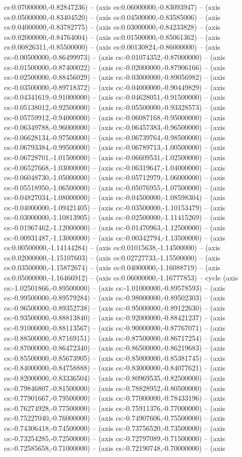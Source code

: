 cs:0.07000000,-0.82847236) -- (axis cs:0.06000000,-0.83093947) -- (axis cs:0.05000000,-0.83404520) -- (axis cs:0.04500000,-0.83585006) -- (axis cs:0.04000000,-0.83782775) -- (axis cs:0.03000000,-0.84233828) -- (axis cs:0.02000000,-0.84764004) -- (axis cs:0.01500000,-0.85061362) -- (axis cs:0.00826311,-0.85500000) -- (axis cs:0.00130824,-0.86000000) -- (axis cs:-0.00500000,-0.86499973) -- (axis cs:-0.01074352,-0.87000000) -- (axis cs:-0.01500000,-0.87400022) -- (axis cs:-0.02000000,-0.87906166) -- (axis cs:-0.02500000,-0.88456029) -- (axis cs:-0.03000000,-0.89056982) -- (axis cs:-0.03500000,-0.89718372) -- (axis cs:-0.04000000,-0.90449829) -- (axis cs:-0.04341619,-0.91000000) -- (axis cs:-0.04628051,-0.91500000) -- (axis cs:-0.05138012,-0.92500000) -- (axis cs:-0.05500000,-0.93328573) -- (axis cs:-0.05759912,-0.94000000) -- (axis cs:-0.06087168,-0.95000000) -- (axis cs:-0.06349788,-0.96000000) -- (axis cs:-0.06457383,-0.96500000) -- (axis cs:-0.06628134,-0.97500000) -- (axis cs:-0.06739764,-0.98500000) -- (axis cs:-0.06793384,-0.99500000) -- (axis cs:-0.06789713,-1.00500000) -- (axis cs:-0.06728701,-1.01500000) -- (axis cs:-0.06609531,-1.02500000) -- (axis cs:-0.06527668,-1.03000000) -- (axis cs:-0.06319647,-1.04000000) -- (axis cs:-0.06048730,-1.05000000) -- (axis cs:-0.05712979,-1.06000000) -- (axis cs:-0.05518950,-1.06500000) -- (axis cs:-0.05076955,-1.07500000) -- (axis cs:-0.04827034,-1.08000000) -- (axis cs:-0.04500000,-1.08598304) -- (axis cs:-0.04000000,-1.09421405) -- (axis cs:-0.03500000,-1.10153479) -- (axis cs:-0.03000000,-1.10813905) -- (axis cs:-0.02500000,-1.11415269) -- (axis cs:-0.01967462,-1.12000000) -- (axis cs:-0.01470963,-1.12500000) -- (axis cs:-0.00931487,-1.13000000) -- (axis cs:-0.00342794,-1.13500000) -- (axis cs:0.00500000,-1.14144284) -- (axis cs:0.01015638,-1.14500000) -- (axis cs:0.02000000,-1.15107603) -- (axis cs:0.02727733,-1.15500000) -- (axis cs:0.03500000,-1.15872674) -- (axis cs:0.04000000,-1.16088719) -- (axis cs:0.05000000,-1.16466912) -- (axis cs:0.06000000,-1.16777853) -- cycle (axis cs:-1.02501866,-0.89500000) -- (axis cs:-1.01000000,-0.89578593) -- (axis cs:-0.99500000,-0.89579284) -- (axis cs:-0.98000000,-0.89502303) -- (axis cs:-0.96500000,-0.89352738) -- (axis cs:-0.95000000,-0.89122630) -- (axis cs:-0.93500000,-0.88813840) -- (axis cs:-0.92000000,-0.88421237) -- (axis cs:-0.91000000,-0.88113567) -- (axis cs:-0.90000000,-0.87767071) -- (axis cs:-0.88500000,-0.87169151) -- (axis cs:-0.87500000,-0.86717254) -- (axis cs:-0.87000000,-0.86472340) -- (axis cs:-0.86500000,-0.86219683) -- (axis cs:-0.85500000,-0.85673905) -- (axis cs:-0.85000000,-0.85381745) -- (axis cs:-0.84000000,-0.84758888) -- (axis cs:-0.83000000,-0.84077621) -- (axis cs:-0.82000000,-0.83336504) -- (axis cs:-0.80969535,-0.82500000) -- (axis cs:-0.79846807,-0.81500000) -- (axis cs:-0.78828952,-0.80500000) -- (axis cs:-0.77901667,-0.79500000) -- (axis cs:-0.77000000,-0.78433196) -- (axis cs:-0.76274928,-0.77500000) -- (axis cs:-0.75911376,-0.77000000) -- (axis cs:-0.75227040,-0.76000000) -- (axis cs:-0.74907606,-0.75500000) -- (axis cs:-0.74306418,-0.74500000) -- (axis cs:-0.73756520,-0.73500000) -- (axis cs:-0.73254285,-0.72500000) -- (axis cs:-0.72797089,-0.71500000) -- (axis cs:-0.72585658,-0.71000000) -- (axis cs:-0.72190748,-0.70000000) -- (axis 
